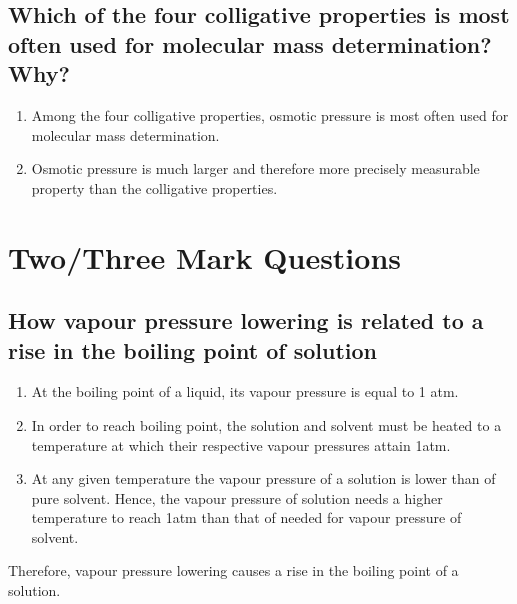 \documentclass{article}
\begin{document}
   \subsection{Which of the four colligative properties is most often
   used for molecular mass determination? Why?}
   \begin{enumerate}
	\item Among the four colligative properties, osmotic pressure
	is most often used for 	molecular mass determination.
	\item Osmotic pressure is much larger and therefore more 
	precisely measurable property than the colligative properties.
   \end{enumerate}

   \section{Two/Three Mark Questions}
   
   \subsection{How vapour pressure lowering is related to a rise in 
   the boiling point of solution}
   \begin{enumerate}
	\item At the boiling point of a liquid, its vapour pressure is
	equal to 1 atm.
	\item In order to reach boiling point, the solution and
	solvent must be heated to a temperature at which their 
	respective vapour pressures attain 1atm.
	\item At any given temperature the vapour pressure of a
	solution is lower than of pure solvent. Hence, the vapour
	pressure of solution needs a higher temperature to reach 1atm
	than that of needed for vapour pressure of solvent. 
   \end{enumerate}
   Therefore, vapour pressure lowering causes a rise in the boiling 
   point of a solution.
\end{document}
